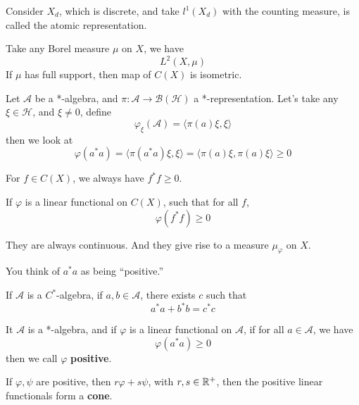 Consider $X_d$, which is discrete, and take $l^1(X_d)$ with the counting measure, is called the atomic representation.

Take any Borel measure $\mu$ on $X$, we have
\begin{equation*}
    L^2(X,\mu)
\end{equation*}
If $\mu$ has full support, then map of $C(X)$ is isometric.

Let $\mathcal{A}$ be a *-algebra, and $\pi:\mathcal{A}\to\mathcal{B}(\mathcal{H})$ a *-representation. Let's take any $\xi\in\mathcal{H}$, and $\xi\neq 0$, define
\begin{equation*}
    \varphi_\xi(\mathcal{A})=\langle \pi(a)\xi, \xi\rangle 
\end{equation*}
then we look at 
\begin{equation*}
    \varphi(a^*a)=\langle\pi(a^*a)\xi, \xi\rangle=\langle \pi(a)\xi, \pi(a)\xi\rangle\geq 0
\end{equation*}
\begin{note}
    For $f\in C(X)$, we always have $f^*f\geq 0$.
\end{note}
\begin{definition}
    If $\varphi$ is a linear functional on $C(X)$, such that for all $f$,
    \begin{equation*}
        \varphi(f^*f)\geq 0
    \end{equation*}
\end{definition}
\begin{remark}
    They are always continuous. And they give rise to a measure $\mu_\varphi$ on $X$.
\end{remark}
You think of $a^*a$ as being ``positive.''

\begin{proposition}
    If $\mathcal{A}$ is a $C^*$-algebra, if $a,b\in\mathcal{A}$, there exists $c$ such that
    \begin{equation*}
        a^*a+b^*b=c^*c
    \end{equation*}
\end{proposition}

\begin{definition}
    It $\mathcal{A}$ is a *-algebra, and if $\varphi$ is a linear functional on $\mathcal{A}$, if for all $a\in\mathcal{A}$, we have
    \begin{equation*}
        \varphi(a^*a)\geq 0
    \end{equation*}
    then we call $\varphi$ \textbf{positive}.
\end{definition}
\begin{proposition}
    If $\varphi, \psi$ are positive, then $r\varphi+s\psi$, with $r,s\in\mathbb{R}^+$, then the positive linear functionals form a \textbf{cone}.
\end{proposition}

